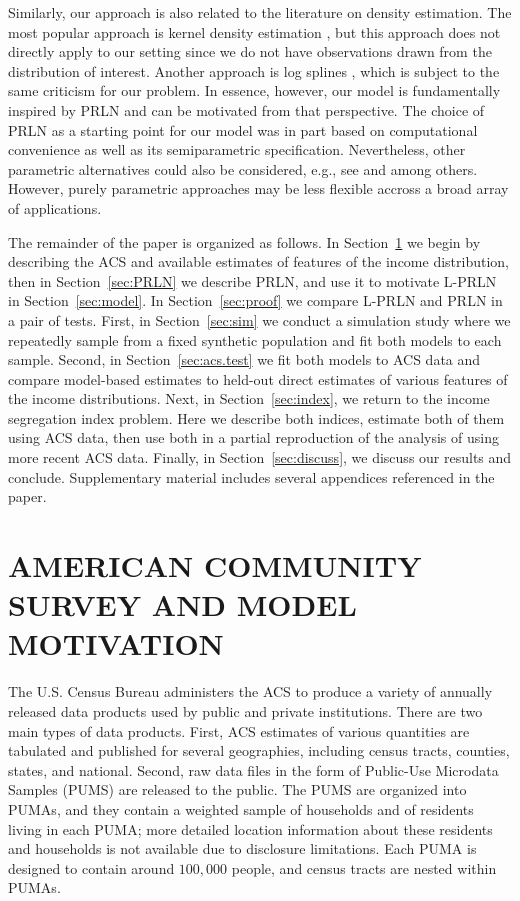 \documentclass[12pt]{article}
\begin{document}
Similarly, our approach is also related to the literature on density estimation. The most popular approach is kernel density estimation \citep[e.g.][]{scott2015multivariate}, but this approach does not directly apply to our setting since we do not have observations drawn from the distribution of interest. Another approach is log splines \citep{kooperberg1992logspline, stone1994use}, which is subject to the same criticism for our problem. In essence, however, our model is fundamentally inspired by PRLN and can be motivated from that perspective. The choice of PRLN as a starting point for our model was in part based on computational convenience as well as its semiparametric specification. Nevertheless, other parametric alternatives could also be considered, e.g., see \citet{singh1976function} and \citet{Dagum1977} among others. However, purely parametric approaches may be less flexible accross a broad array of applications.

The remainder of the paper is organized as follows. In Section~\ref{sec:acs.model} we begin by describing the ACS and available estimates of features of the income distribution, then in Section~\ref{sec:PRLN} we describe PRLN, and use it to motivate L-PRLN in Section~\ref{sec:model}. In Section~\ref{sec:proof} we compare L-PRLN and PRLN in a pair of tests. First, in Section~\ref{sec:sim} we conduct a simulation study where we repeatedly sample from a fixed synthetic population and fit both models to each sample. Second, in Section~\ref{sec:acs.test} we fit both models to ACS data and compare model-based estimates to held-out direct estimates of various features of the income distributions. Next, in Section~\ref{sec:index}, we return to the income segregation index problem. Here we describe both indices, estimate both of them using ACS data, then use both in a partial reproduction of the analysis of \citet{reardon2011income} using more recent ACS data. Finally, in Section~\ref{sec:discuss}, we discuss our results and conclude. Supplementary material includes several appendices referenced in the paper.

\section{AMERICAN COMMUNITY SURVEY AND MODEL MOTIVATION}\label{sec:acs.model}
The U.S. Census Bureau administers the ACS to produce a variety of annually released data products used by public and private institutions. There are two main types of data products. First, ACS estimates of various quantities are tabulated and published for several geographies, including census tracts, counties, states, and national. Second, raw data files in the form of Public-Use Microdata Samples (PUMS) are released to the public. The PUMS are organized into PUMAs, and they contain a weighted sample of households and of residents living in each PUMA; more detailed location information about these residents and households is not available due to disclosure limitations. Each PUMA is designed to contain around $100,000$ people, and census tracts are nested within PUMAs.
\end{document}

